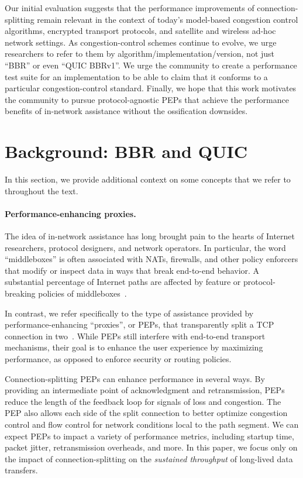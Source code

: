 \noindent Our initial evaluation suggests that the performance improvements of
connection-splitting remain relevant in the context of today's model-based
congestion control algorithms, encrypted transport protocols, and satellite and
wireless ad-hoc network settings. As congestion-control schemes continue to
evolve, we urge researchers to refer to them by
algorithm/implementation/version, not just ``BBR'' or even ``QUIC BBRv1''. We
urge the community to create a performance test suite for an implementation to
be able to claim that it conforms to a particular congestion-control standard.
Finally, we hope that this work motivates the community to pursue
protocol-agnostic PEPs that achieve the performance benefits of in-network
assistance without the ossification downsides.

\section{Background: BBR and QUIC}
\label{sec:splitting:background}

In this section, we provide additional context on some concepts that we refer to
throughout the text.

\paragraph{Performance-enhancing proxies.}

The idea of in-network assistance has long brought pain to the hearts of
Internet researchers, protocol designers, and network operators. In particular,
the word ``middleboxes'' is often associated with NATs, firewalls, and other
policy enforcers that modify or inspect data in ways that break end-to-end
behavior. A substantial percentage of Internet paths are affected by feature or
protocol-breaking policies of middleboxes~\cite{edeline2019bottomup}.

In contrast, we refer specifically to the type of assistance provided by
performance-enhancing ``proxies'', or PEPs, that transparently split a TCP
connection in two~\cite{rfc3135}. While PEPs still interfere with end-to-end
transport mechanisms, their goal is to enhance the user experience by
maximizing performance, as opposed to enforce security or routing policies.

Connection-splitting PEPs can enhance performance in several ways. By providing
an intermediate point of acknowledgment and retransmission, PEPs reduce the
length of the feedback loop for signals of loss and congestion. The PEP also
allows each side of the split connection to better optimize congestion control
and flow control for network conditions local to the path segment. We can
expect PEPs to impact a variety of performance metrics, including startup time,
packet jitter, retransmission overheads, and more. In this paper, we focus
only on the impact of connection-splitting on the \textit{sustained throughput}
of long-lived data transfers.


